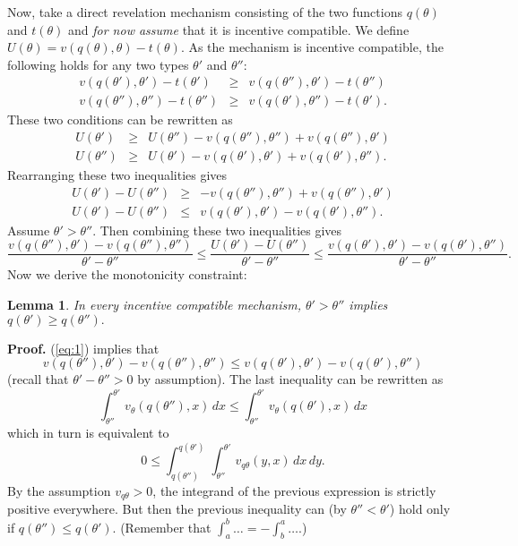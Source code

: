 \documentclass[12pt]{article}
\newtheorem{lemma}{Lemma}
\begin{document}
Now, take a direct revelation mechanism consisting of the two functions $q(\theta )$ and $t(\theta )$ and \emph{for now assume} that it is  incentive compatible. We define $U(\theta )=v(q(\theta ),\theta )-t(\theta )$. As the mechanism is incentive compatible, the following holds for any two types $\theta '$ and $\theta ''$:
\begin{eqnarray*}
  v(q(\theta' ),\theta' )-t(\theta' )&\geq&v(q(\theta'' ),\theta' )-t(\theta'' )\\
v(q(\theta'' ),\theta'' )-t(\theta'' )&\geq&v(q(\theta' ),\theta'' )-t(\theta' ).
\end{eqnarray*}
These two conditions can be rewritten as 
\begin{eqnarray*}
  U(\theta ')&\geq&U(\theta '') -v(q(\theta ''),\theta '')+v(q(\theta ''),\theta ')\\
U(\theta'' )&\geq&U(\theta ') -v(q(\theta '),\theta ')+v(q(\theta '),\theta '').
\end{eqnarray*}
Rearranging these two inequalities gives 
\begin{eqnarray*}
  U(\theta ')-U(\theta '')&\geq& -v(q(\theta ''),\theta '')+v(q(\theta ''),\theta ')\\
U(\theta ')-U(\theta'' )&\leq& v(q(\theta '),\theta ')-v(q(\theta '),\theta '').
\end{eqnarray*}
Assume $\theta '>\theta ''$. Then combining these two inequalities gives
\begin{equation}
  \label{eq:1}
 \frac{ v(q(\theta ''),\theta ')-v(q(\theta ''),\theta '')}{\theta '-\theta ''} \leq \frac{ U(\theta ')-U(\theta '')}{\theta '-\theta ''}\leq \frac{ v(q(\theta '),\theta ')-v(q(\theta '),\theta '')}{\theta '-\theta ''}.
\end{equation}
Now we derive the monotonicity constraint: 
\begin{lemma}\label{lem:mon}
  In every incentive compatible mechanism, $\theta '>\theta ''$ implies $q(\theta ')\geq q(\theta '').$ 
\end{lemma}
\textbf{Proof. }(\ref{eq:1}) implies that 
\begin{equation*}
v(q(\theta ''),\theta ')-v(q(\theta ''),\theta '')\leq v(q(\theta '),\theta ')-v(q(\theta '),\theta '')
\end{equation*}
(recall that $\theta '-\theta ''>0$ by assumption). The last inequality can be rewritten as
\begin{equation*}
  \int_{\theta ''}^{\theta '}v_\theta (q(\theta ''),x)\,dx\leq \int_{\theta ''}^{\theta '}v_\theta (q(\theta '),x)\,dx
\end{equation*}
which in turn is equivalent to 
\begin{equation*}
0\leq \int_{q(\theta '')}^{q(\theta ')}\int_{\theta ''}^{\theta '}v_{q\theta} (y,x)\,dx\,dy.
\end{equation*}
By the assumption $v_{q\theta }>0$, the integrand of the previous expression is strictly positive everywhere. But then the previous inequality can (by $\theta ''<\theta '$) hold only if $q(\theta '')\leq q(\theta ')$. (Remember that $\int_a^b\dots=-\int_b^a\dots$.)
\end{document}
